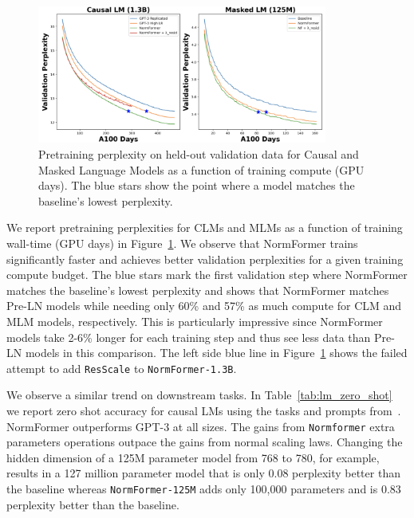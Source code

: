 \documentclass{article} %
\begin{document}
\begin{figure}[t]
\centering
\includegraphics[width=0.85\textwidth]{curves_v6.jpg}
\caption{Pretraining perplexity on held-out validation data for Causal and Masked Language Models as a function of training compute (GPU days). The blue stars show the point where a model matches the baseline's lowest perplexity. %
}
\label{fig:clm_pt}
\end{figure}


We report pretraining perplexities for CLMs and MLMs as a function of training wall-time (GPU days) in Figure~\ref{fig:clm_pt}.
We observe that NormFormer trains significantly faster and achieves better validation perplexities for a given training compute budget.
The blue stars mark the first validation step where NormFormer matches the baseline's lowest perplexity and shows that NormFormer matches Pre-LN models while needing only 60\% and 57\% as much compute for CLM and MLM models, respectively.
This is particularly impressive since NormFormer models take 2-6\% longer for each training step and thus see less data than Pre-LN models in this comparison. The left side blue line in Figure~\ref{fig:clm_pt} shows the failed attempt to add \texttt{ResScale} to \texttt{NormFormer-1.3B}.

We observe a similar trend on downstream tasks.
In Table~\ref{tab:lm_zero_shot} we report zero shot accuracy for causal LMs using the tasks and prompts from~\citet{brown2020gpt3}.
NormFormer outperforms GPT-3 at all sizes.
The gains from \texttt{Normformer} extra parameters operations outpace the gains from normal scaling laws. Changing the hidden dimension of a 125M parameter model from 768 to 780, for example, results in a 127 million parameter model that is only 0.08 perplexity better than the baseline whereas \texttt{NormFormer-125M} adds only 100,000 parameters and is 0.83 perplexity better than the baseline.
\end{document}

